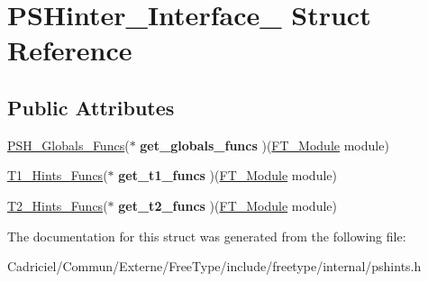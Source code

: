 \hypertarget{struct_p_s_hinter___interface__}{}\section{P\+S\+Hinter\+\_\+\+Interface\+\_\+ Struct Reference}
\label{struct_p_s_hinter___interface__}
\subsection*{Public Attributes}
\begin{DoxyCompactItemize}
\item 
\hyperlink{struct_p_s_h___globals___funcs_rec__}{P\+S\+H\+\_\+\+Globals\+\_\+\+Funcs}($\ast$ {\bfseries get\+\_\+globals\+\_\+funcs} )(\hyperlink{struct_f_t___module_rec__}{F\+T\+\_\+\+Module} module)\hypertarget{struct_p_s_hinter___interface___a76e43921277f51cb28ac5f5ca5d4d849}{}\label{struct_p_s_hinter___interface___a76e43921277f51cb28ac5f5ca5d4d849}

\item 
\hyperlink{struct_t1___hints___funcs_rec__}{T1\+\_\+\+Hints\+\_\+\+Funcs}($\ast$ {\bfseries get\+\_\+t1\+\_\+funcs} )(\hyperlink{struct_f_t___module_rec__}{F\+T\+\_\+\+Module} module)\hypertarget{struct_p_s_hinter___interface___ae46a2b9590a09e77c7fa435e5e6d7cb4}{}\label{struct_p_s_hinter___interface___ae46a2b9590a09e77c7fa435e5e6d7cb4}

\item 
\hyperlink{struct_t2___hints___funcs_rec__}{T2\+\_\+\+Hints\+\_\+\+Funcs}($\ast$ {\bfseries get\+\_\+t2\+\_\+funcs} )(\hyperlink{struct_f_t___module_rec__}{F\+T\+\_\+\+Module} module)\hypertarget{struct_p_s_hinter___interface___aff676c6c5e3ca1d266cdd2d4321b21f2}{}\label{struct_p_s_hinter___interface___aff676c6c5e3ca1d266cdd2d4321b21f2}

\end{DoxyCompactItemize}


The documentation for this struct was generated from the following file\+:\begin{DoxyCompactItemize}
\item 
Cadriciel/\+Commun/\+Externe/\+Free\+Type/include/freetype/internal/pshints.\+h\end{DoxyCompactItemize}
